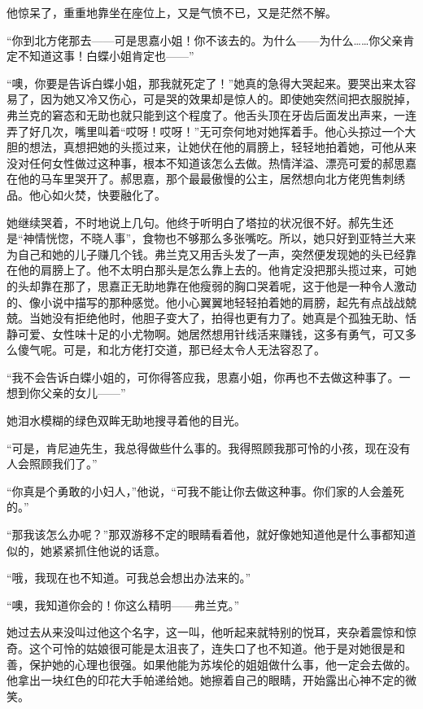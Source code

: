 \par 他惊呆了，重重地靠坐在座位上，又是气愤不已，又是茫然不解。
\par “你到北方佬那去——可是思嘉小姐！你不该去的。为什么——为什么……你父亲肯定不知道这事！白蝶小姐肯定也——”
\par “噢，你要是告诉白蝶小姐，那我就死定了！”她真的急得大哭起来。要哭出来太容易了，因为她又冷又伤心，可是哭的效果却是惊人的。即使她突然间把衣服脱掉，弗兰克的窘态和无助也就只能到这个程度了。他舌头顶在牙齿后面发出声来，一连弄了好几次，嘴里叫着“哎呀！哎呀！”无可奈何地对她挥着手。他心头掠过一个大胆的想法，真想把她的头揽过来，让她伏在他的肩膀上，轻轻地拍着她，可他从来没对任何女性做过这种事，根本不知道该怎么去做。热情洋溢、漂亮可爱的郝思嘉在他的马车里哭开了。郝思嘉，那个最最傲慢的公主，居然想向北方佬兜售刺绣品。他心如火焚，快要融化了。
\par 她继续哭着，不时地说上几句。他终于听明白了塔拉的状况很不好。郝先生还是“神情恍惚，不晓人事”，食物也不够那么多张嘴吃。所以，她只好到亚特兰大来为自己和她的儿子赚几个钱。弗兰克又用舌头发了一声，突然便发现她的头已经靠在他的肩膀上了。他不太明白那头是怎么靠上去的。他肯定没把那头揽过来，可她的头却靠在那了，思嘉正无助地靠在他瘦弱的胸口哭着呢，这于他是一种令人激动的、像小说中描写的那种感觉。他小心翼翼地轻轻拍着她的肩膀，起先有点战战兢兢。当她没有拒绝他时，他胆子变大了，拍得也更有力了。她真是个孤独无助、恬静可爱、女性味十足的小尤物啊。她居然想用针线活来赚钱，这多有勇气，可又多么傻气呢。可是，和北方佬打交道，那已经太令人无法容忍了。
\par “我不会告诉白蝶小姐的，可你得答应我，思嘉小姐，你再也不去做这种事了。一想到你父亲的女儿——”
\par 她泪水模糊的绿色双眸无助地搜寻着他的目光。
\par “可是，肯尼迪先生，我总得做些什么事的。我得照顾我那可怜的小孩，现在没有人会照顾我们了。”
\par “你真是个勇敢的小妇人，”他说，“可我不能让你去做这种事。你们家的人会羞死的。”
\par “那我该怎么办呢？”那双游移不定的眼睛看着他，就好像她知道他是什么事都知道似的，她紧紧抓住他说的话意。
\par “哦，我现在也不知道。可我总会想出办法来的。”
\par “噢，我知道你会的！你这么精明——弗兰克。”
\par 她过去从来没叫过他这个名字，这一叫，他听起来就特别的悦耳，夹杂着震惊和惊奇。这个可怜的姑娘很可能是太沮丧了，连失口了也不知道。他于是对她很是和善，保护她的心理也很强。如果他能为苏埃伦的姐姐做什么事，他一定会去做的。他拿出一块红色的印花大手帕递给她。她擦着自己的眼睛，开始露出心神不定的微笑。

